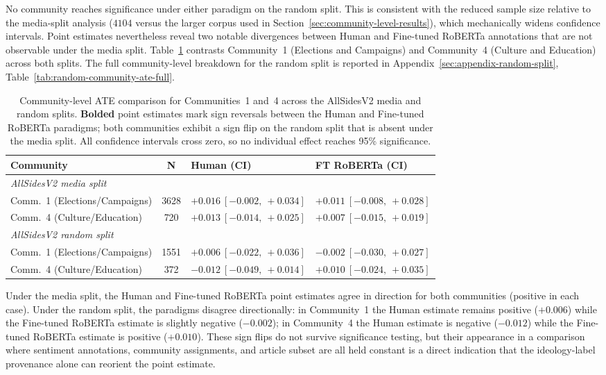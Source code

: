No community reaches significance under either paradigm on the random split. This is consistent with the reduced sample size relative to the media-split analysis ($\num{4104}$ versus the larger corpus used in Section~\ref{sec:community-level-results}), which mechanically widens confidence intervals. Point estimates nevertheless reveal two notable divergences between Human and Fine-tuned RoBERTa annotations that are not observable under the media split. Table~\ref{tab:random-community-delta} contrasts Community~1 (Elections and Campaigns) and Community~4 (Culture and Education) across both splits. The full community-level breakdown for the random split is reported in Appendix~\ref{sec:appendix-random-split}, Table~\ref{tab:random-community-ate-full}.

\begin{table}[ht]
  \centering
  \small
  \begin{tabular}{l c l l}
    \toprule
    \textbf{Community} & \textbf{N} & \textbf{Human (CI)} & \textbf{FT RoBERTa (CI)} \\
    \midrule
    \multicolumn{4}{l}{\textit{AllSidesV2 media split}} \\
    Comm.\ 1 (Elections/Campaigns) & \num{3628} & $+0.016\ [-0.002,\ +0.034]$ & $+0.011\ [-0.008,\ +0.028]$ \\
    Comm.\ 4 (Culture/Education)   & 720        & $+0.013\ [-0.014,\ +0.025]$ & $+0.007\ [-0.015,\ +0.019]$ \\
    \midrule
    \multicolumn{4}{l}{\textit{AllSidesV2 random split}} \\
    Comm.\ 1 (Elections/Campaigns) & \num{1551} & $+0.006\ [-0.022,\ +0.036]$ & $\mathbf{-0.002}\ [-0.030,\ +0.027]$ \\
    Comm.\ 4 (Culture/Education)   & 372        & $\mathbf{-0.012}\ [-0.049,\ +0.014]$ & $+0.010\ [-0.024,\ +0.035]$ \\
    \bottomrule
  \end{tabular}
  \caption{Community-level ATE comparison for Communities~1 and~4 across the AllSidesV2 media and random splits. \textbf{Bolded} point estimates mark sign reversals between the Human and Fine-tuned RoBERTa paradigms; both communities exhibit a sign flip on the random split that is absent under the media split. All confidence intervals cross zero, so no individual effect reaches 95\% significance.}
  \label{tab:random-community-delta}
\end{table}

Under the media split, the Human and Fine-tuned RoBERTa point estimates agree in direction for both communities (positive in each case). Under the random split, the paradigms disagree directionally: in Community~1 the Human estimate remains positive ($+0.006$) while the Fine-tuned RoBERTa estimate is slightly negative ($-0.002$); in Community~4 the Human estimate is negative ($-0.012$) while the Fine-tuned RoBERTa estimate is positive ($+0.010$). These sign flips do not survive significance testing, but their appearance in a comparison where sentiment annotations, community assignments, and article subset are all held constant is a direct indication that the ideology-label provenance alone can reorient the point estimate.

